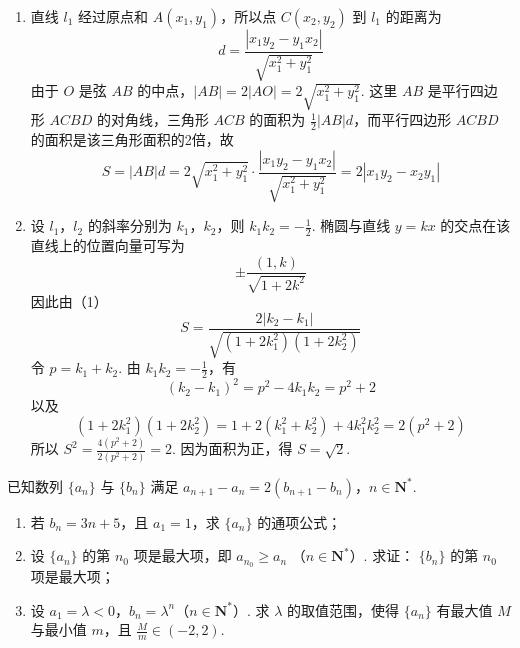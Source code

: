 \begin{solution}
\begin{enumerate}
\item 直线 \(l_1\) 经过原点和 \(A(x_1,y_1)\)，所以点 \(C(x_2,y_2)\) 到 \(l_1\) 的距离为
\[
d=\frac{|x_1y_2-y_1x_2|}{\sqrt{x_1^2+y_1^2}}
\]
由于 \(O\) 是弦 \(AB\) 的中点，\(|AB|=2|AO|=2\sqrt{x_1^2+y_1^2}\). 这里 \(AB\) 是平行四边形 \(ACBD\) 的对角线，三角形 \(ACB\) 的面积为 \(\frac12|AB|d\)，而平行四边形 \(ACBD\) 的面积是该三角形面积的2倍，故
\[
S=|AB|d=2\sqrt{x_1^2+y_1^2}\cdot\frac{|x_1y_2-y_1x_2|}{\sqrt{x_1^2+y_1^2}}=2|x_1y_2-x_2y_1|
\]

\item 设 \(l_1\)，\(l_2\) 的斜率分别为 \(k_1\)，\(k_2\)，则 \(k_1k_2=-\frac12\). 椭圆与直线 \(y=kx\) 的交点在该直线上的位置向量可写为
\[
\pm\frac{(1,k)}{\sqrt{1+2k^2}}
\]
因此由（1）
\[
S=\frac{2|k_2-k_1|}{\sqrt{(1+2k_1^2)(1+2k_2^2)}}
\]
令 \(p=k_1+k_2\). 由 \(k_1k_2=-\frac12\)，有
\[
(k_2-k_1)^2=p^2-4k_1k_2=p^2+2
\]
以及
\[
(1+2k_1^2)(1+2k_2^2)=1+2(k_1^2+k_2^2)+4k_1^2k_2^2=2(p^2+2)
\]
所以 \(S^2=\frac{4(p^2+2)}{2(p^2+2)}=2\). 因为面积为正，得 \(S=\sqrt2\).
\end{enumerate}
\end{solution}

\begin{problem}
已知数列 \(\{a_{n}\}\) 与 \(\{b_{n}\}\) 满足 \(a_{n + 1} - a_n = 2(b_{n + 1} - b_n)\)，\(n \in \mathbf{N}^*\).
\begin{enumerate}
\item 若 \(b_{n} = 3n + 5\)，且 \(a_{1} = 1\)，求 \(\{a_{n}\}\) 的通项公式；
\item 设 \(\{a_{n}\}\) 的第 \(n_0\) 项是最大项，即 \(a_{n_0} \geqslant a_n\) （\(n \in \mathbf{N}^*\)）. 求证： \(\{b_n\}\) 的第 \(n_0\) 项是最大项；
\item 设 \(a_1 = \lambda < 0\)，\(b_n = \lambda^n\)（\(n \in \mathbf{N}^*\)）. 求 \(\lambda\) 的取值范围，使得 \(\{a_n\}\) 有最大值 \(M\) 与最小值 \(m\)，且 \(\frac{M}{m} \in (-2, 2)\).
\end{enumerate}
\end{problem}

